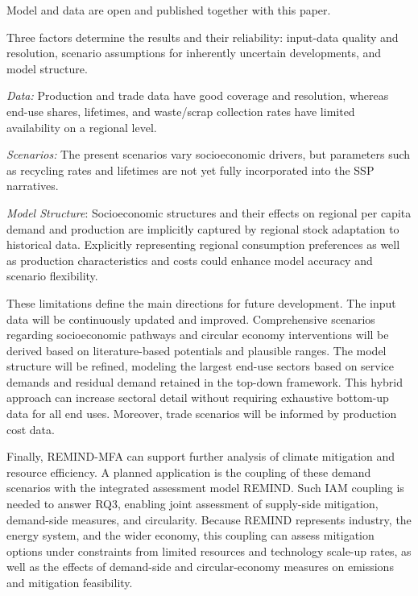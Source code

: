 \documentclass[pdflatex]{sn-jnl}
\begin{document}
Model and data are open and published together with this paper.

Three factors determine the results and their reliability: input-data quality and resolution, scenario assumptions for inherently uncertain developments, and model structure.

\textit{Data:} Production and trade data have good coverage and resolution, whereas end-use shares, lifetimes, and waste/scrap collection rates have limited availability on a regional level.

\textit{Scenarios:} The present scenarios vary socioeconomic drivers, but parameters such as recycling rates and lifetimes are not yet fully incorporated into the SSP narratives.

\textit{Model Structure}: Socioeconomic structures and their effects on regional per capita demand and production are implicitly captured by regional stock adaptation to historical data. Explicitly representing regional consumption preferences as well as production characteristics and costs could enhance model accuracy and scenario flexibility.

These limitations define the main directions for future development. The input data will be continuously updated and improved. Comprehensive scenarios regarding socioeconomic pathways and circular economy interventions will be derived based on literature-based potentials and plausible ranges. The model structure will be refined, modeling the largest end-use sectors based on service demands and residual demand retained in the top-down framework. This hybrid approach can increase sectoral detail without requiring exhaustive bottom-up data for all end uses. Moreover, trade scenarios will be informed by production cost data.

Finally, REMIND-MFA can support further analysis of climate mitigation and resource efficiency. A planned application is the coupling of these demand scenarios with the integrated assessment model REMIND. Such IAM coupling is needed to answer RQ3, enabling joint assessment of supply-side mitigation, demand-side measures, and circularity. Because REMIND represents industry, the energy system, and the wider economy, this coupling can assess mitigation options under constraints from limited resources and technology scale-up rates, as well as the effects of demand-side and circular-economy measures on emissions and mitigation feasibility.
\end{document}
